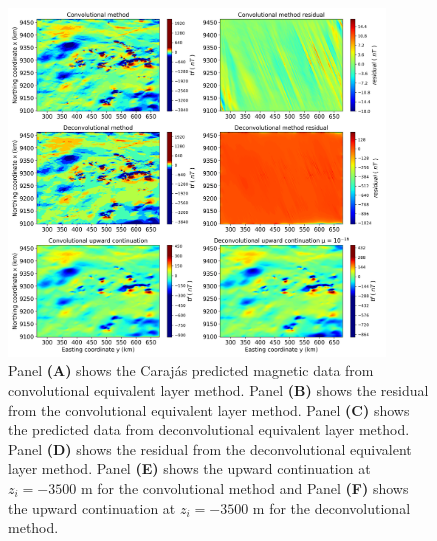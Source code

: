\begin{figure}[htbp]
	\begin{center}
		\includegraphics[width=10cm]{Fig/carajas_tf_predito_1000x500}
	\end{center}
	\caption{Panel \textbf{(A)} shows the Carajás predicted magnetic data from convolutional equivalent layer method. Panel \textbf{(B)} shows the residual from the convolutional equivalent layer method. Panel \textbf{(C)} shows the predicted data from deconvolutional equivalent layer method. Panel \textbf{(D)} shows the residual from the deconvolutional equivalent layer method. Panel \textbf{(E)} shows the upward continuation at $z_i = -3500$ m for the convolutional method and Panel \textbf{(F)} shows the upward continuation at $z_i = -3500$ m for the deconvolutional method.}
	\label{fig:12}
\end{figure}



%



